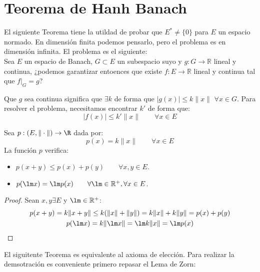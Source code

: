 \newpage

\section{Teorema de Hanh Banach} %
\noindent
El siguiente Teorema tiene la utildad de probar que $E^\ast \neq \{0\}$ para $E$ un espacio normado. En dimensión finita podemos pensarlo, pero el problema es en dimensión infinita. El problema es el siguiente:\\

\noindent
Sea $E$ un espacio de Banach, $G\subset E$ un subespacio suyo y $g:G\to \mathbb{R}$ lineal y continua, ¿podemos garantizar entoences que existe $f:E\to \mathbb{R}$ lineal y continua tal que $f\big|_G = g$?

Que $g$ sea continua significa que $\exists k$ de forma que $|g(x)| \leq k\|x\|$ $\forall x\in G$. Para resolver el problema, necesitamos encontrar $k'$ de forma que:
\begin{equation*}
    |f(x)| \leq k'\|x\| \qquad \forall x\in E
\end{equation*}

\begin{ejercicio} %
    Sea $p:(E,\|\cdot \|)\to \R$ dada por:
    \begin{equation*}
        p(x) = k\|x\| \qquad \forall x\in E
    \end{equation*}
    La función $p$ verifica:
    \begin{itemize}
        \item $p(x+y) \leq p(x) + p(y) \qquad \forall x,y\in E$.
        \item $p(\lm x) = \lm p(x) \qquad \forall \lm \in \mathbb{R}^+, \forall x\in E$.
    \end{itemize}
    \begin{proof}
        Sean $x,y\exists E$ y $\lm\in \mathbb{R}^+$:
        \begin{gather*}
            p(x+y)= k\|x+y\| \leq k(\|x\| + \|y\|) = k\|x\| + k\|y\| = p(x) + p(y) \\
            p(\lm x) = k\|\lm x\| = \lm k \|x\| = \lm p(x)
        \end{gather*}
    \end{proof}
\end{ejercicio}

\noindent
El siguitente Teorema es equivalente al axioma de elección. Para realizar la demsotración es conveniente primero repasar el Lema de Zorn:

